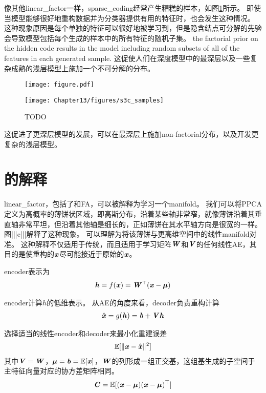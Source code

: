 像其他\gls{linear_factor}一样，\gls{sparse_coding}经常产生糟糕的样本，如图\ref{fig:s3c_samples}所示。
即使当模型能够很好地重构数据并为分类器提供有用的特征时，也会发生这种情况。
这种现象原因是每个单独的特征可以很好地被学习到，但是隐含结点可分解的先验会导致模型包括每个生成的样本中的所有特征的随机子集。
 the factorial prior on the hidden code results in the model including random subsets of all of the features in each generated sample.
这促使人们在深度模型中的最深层以及一些复杂成熟的浅层模型上施加一个不可分解的分布。

\begin{figure}[!htb]
\ifOpenSource
\centerline{\texttt{[image: figure.pdf]}}
\else
	\centerline{\texttt{[image: Chapter13/figures/s3c\_samples]}}
\fi
	\caption{TODO}
	\label{fig:s3c_samples}
\end{figure}

这促进了更深层模型的发展，可以在最深层上施加non-factorial分布，以及开发更复杂的浅层模型。


\section{的解释}
\label{sec:manifold_interpretation_of_pca}


\gls{linear_factor}，包括了和\gls{FA}，可以被解释为学习一个\gls{manifold}\citep{hinton97modelling}。
我们可以将\gls{PPCA}定义为高概率的薄饼状区域，即高斯分布，沿着某些轴非常窄，就像薄饼沿着其垂直轴非常平坦，但沿着其他轴是细长的，正如薄饼在其水平轴方向是很宽的一样。
图|||c|||解释了这种现象。
可以理解为将该薄饼与更高维空间中的线性\gls{manifold}对准。
这种解释不仅适用于传统，而且适用于学习矩阵$\boldsymbol{\mathit{W}}$和$\boldsymbol{\mathit{V}}$的任何线性\gls{AE}，其目的是使重构的$\boldsymbol{\mathit{x}}$尽可能接近于原始的$\boldsymbol{\mathit{x}}$。




\gls{encoder}表示为
\begin{align}
\label{eqn:1319}
\boldsymbol{\mathit{h}}  = f(\boldsymbol{\mathit{x}}) = \boldsymbol{\mathit{W}}^{\top} (\boldsymbol{\mathit{x}} - \boldsymbol{\mu})
\end{align}


\gls{encoder}计算$h$的低维表示。
从\gls{AE}的角度来看，\gls{decoder}负责重构计算
\begin{align}
\label{eqn:1320}
\hat{\boldsymbol{\mathit{x}}} = g(\boldsymbol{\mathit{h}}) = \boldsymbol{\mathit{b}} + \boldsymbol{\mathit{V}} \boldsymbol{\mathit{h}}
\end{align}


选择适当的线性\gls{encoder}和\gls{decoder}来最小化重建误差
\begin{align}
\label{eqn:1321}
\mathbb{E}[\Vert\boldsymbol{\mathit{x}} - \hat{\boldsymbol{\mathit{x}}}\Vert^2]
\end{align}
其中$\boldsymbol{\mathit{V}} = \boldsymbol{\mathit{W}}$，${\boldsymbol{\mu}} = \boldsymbol{\mathit{b}} = \mathbb{E}[\boldsymbol{\mathit{x}}] $，$\boldsymbol{\mathit{W}}$的列形成一组正交基，这组基生成的子空间于主特征向量对应的协方差矩阵相同。
\begin{align}
\label{eqn:1322}
\boldsymbol{\mathit{C}} = \mathbb{E}[(\boldsymbol{\mathit{x}} - {\boldsymbol{\mu}})(\boldsymbol{\mathit{x}} - {\boldsymbol{\mu}})^{\top}]
\end{align}



